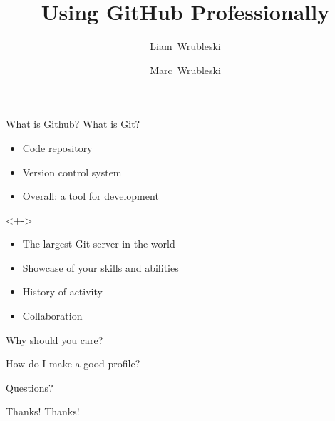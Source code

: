 \documentclass{beamer}
\title{Using GitHub Professionally}
\author{Liam~Wrubleski\inst{1} \and Marc~Wrubleski\inst{2}}
\institute{
  \inst{1}%
  BSc. Electrical Engineering, BSc. Mathematics
  \and
  \inst{2}%
  Technical Manager at the Schulich School of Engineering %
}
\begin{document}
\begin{frame}[plain]
    \maketitle
\end{frame}

\begin{frame}{What is Github?}
  What is Git?\pause
  \begin{itemize}[<+->]
    \item Code repository
    \item Version control system
    \item Overall: a tool for development
  \end{itemize}

  <+->
  \begin{itemize}[<+->]
  	\item The largest Git server in the world
  	\item Showcase of your skills and abilities
    \item History of activity
    \item Collaboration %
  \end{itemize}
\end{frame}

\begin{frame}{Why should you care?}
\end{frame}

\begin{frame}{How do I make a good profile?}
\end{frame}

\begin{frame}{Questions?}
\end{frame}

\begin{frame}{Thanks!}
  Thanks!
\end{frame}
\end{document}
